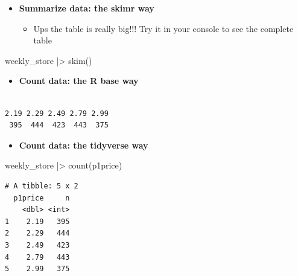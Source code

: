 \documentclass[
  ignorenonframetext,
]{beamer}
\newenvironment{Shaded}{\begin{snugshade}}{\end{snugshade}}
\newcommand{\FunctionTok}[1]{\textcolor[rgb]{0.28,0.35,0.67}{#1}}
\newcommand{\NormalTok}[1]{\textcolor[rgb]{0.00,0.23,0.31}{#1}}
\newcommand{\SpecialCharTok}[1]{\textcolor[rgb]{0.37,0.37,0.37}{#1}}
\providecommand{\tightlist}{%
  \setlength{\itemsep}{0pt}\setlength{\parskip}{0pt}}\usepackage{longtable,booktabs,array}
\begin{document}
\begin{frame}[fragile]{}
\label{section-8}
\begin{itemize}
\item
  \textbf{Summarize data: the skimr way}

  \begin{itemize}
  \tightlist
  \item
    Ups the table is really big!!! Try it in your console to see the
    complete table
  \end{itemize}
\end{itemize}

\tiny

\begin{Shaded}
\begin{Highlighting}[]
\NormalTok{weekly\_store }\SpecialCharTok{|\textgreater{}} \FunctionTok{skim}\NormalTok{()}
\end{Highlighting}
\end{Shaded}
\end{frame}

\begin{frame}[fragile]{}
\label{section-9}
\begin{itemize}
\tightlist
\item
  \textbf{Count data: the R base way}
\end{itemize}

\tiny

\begin{Shaded}
\end{Shaded}

\begin{verbatim}

2.19 2.29 2.49 2.79 2.99 
 395  444  423  443  375 
\end{verbatim}

\normalsize

\begin{itemize}
\tightlist
\item
  \textbf{Count data: the tidyverse way}
\end{itemize}

\tiny

\begin{Shaded}
\begin{Highlighting}[]
\NormalTok{weekly\_store }\SpecialCharTok{|\textgreater{}} \FunctionTok{count}\NormalTok{(p1price)}
\end{Highlighting}
\end{Shaded}

\begin{verbatim}
# A tibble: 5 x 2
  p1price     n
    <dbl> <int>
1    2.19   395
2    2.29   444
3    2.49   423
4    2.79   443
5    2.99   375
\end{verbatim}
\end{frame}
\end{document}
